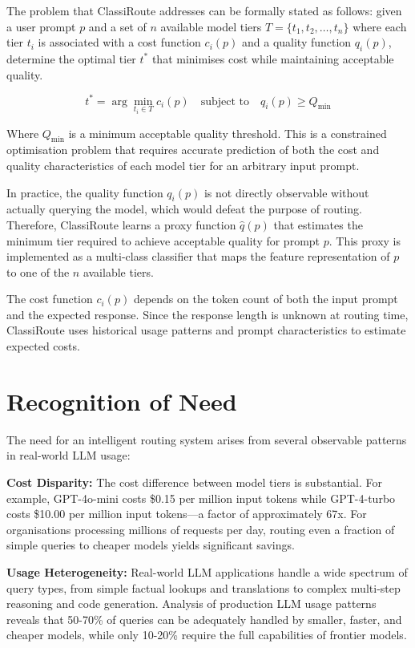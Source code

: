 \documentclass[oneside,12pt,a4paper]{report}
\begin{document}
The problem that ClassiRoute addresses can be formally stated as follows: given a user prompt \(p\) and a set of \(n\) available model tiers \(T = \{t_1, t_2, \dots, t_n\}\) where each tier \(t_i\) is associated with a cost function \(c_i(p)\) and a quality function \(q_i(p)\), determine the optimal tier \(t^*\) that minimises cost while maintaining acceptable quality.

\[
t^* = \arg\min_{t_i \in T} c_i(p) \quad \text{subject to} \quad q_i(p) \geq Q_{\text{min}}
\]

Where \(Q_{\text{min}}\) is a minimum acceptable quality threshold. This is a constrained optimisation problem that requires accurate prediction of both the cost and quality characteristics of each model tier for an arbitrary input prompt.

In practice, the quality function \(q_i(p)\) is not directly observable without actually querying the model, which would defeat the purpose of routing. Therefore, ClassiRoute learns a proxy function \(\hat{q}(p)\) that estimates the minimum tier required to achieve acceptable quality for prompt \(p\). This proxy is implemented as a multi-class classifier that maps the feature representation of \(p\) to one of the \(n\) available tiers.

The cost function \(c_i(p)\) depends on the token count of both the input prompt and the expected response. Since the response length is unknown at routing time, ClassiRoute uses historical usage patterns and prompt characteristics to estimate expected costs.

\section{Recognition of Need}

The need for an intelligent routing system arises from several observable patterns in real-world LLM usage:

\textbf{Cost Disparity:} The cost difference between model tiers is substantial. For example, GPT-4o-mini costs \$0.15 per million input tokens while GPT-4-turbo costs \$10.00 per million input tokens---a factor of approximately 67x. For organisations processing millions of requests per day, routing even a fraction of simple queries to cheaper models yields significant savings.

\textbf{Usage Heterogeneity:} Real-world LLM applications handle a wide spectrum of query types, from simple factual lookups and translations to complex multi-step reasoning and code generation. Analysis of production LLM usage patterns reveals that 50-70\% of queries can be adequately handled by smaller, faster, and cheaper models, while only 10-20\% require the full capabilities of frontier models.
\end{document}

